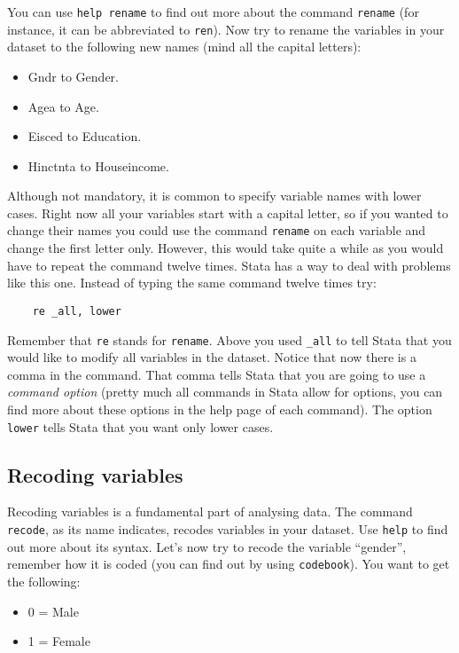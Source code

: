\documentclass{article}
\begin{document}
You can use \texttt{help rename} to find out more about the command \texttt{rename} (for instance, it can be abbreviated to \texttt{ren}). Now try to rename the variables in your dataset to the following new names (mind all the capital letters):

\begin{itemize}
	\item Gndr to Gender.
	\item Agea to Age.
	\item Eisced to Education.
	\item Hinctnta to Houseincome.
\end{itemize}

Although not mandatory, it is common to specify variable names with lower cases. Right now all your variables start with a capital letter, so if you wanted to change their names you could use the command \texttt{rename} on each variable and change the first letter only. However, this would take quite a while as you would have to repeat the command twelve times. Stata has a way to deal with problems like this one. Instead of typing the same command twelve times try:

\begin{lstlisting}
	re _all, lower
\end{lstlisting}

Remember that \texttt{re} stands for \texttt{rename}. Above you used \texttt{\_all} to tell Stata that you would like to modify all variables in the dataset. Notice that now there is a comma in the command. That comma tells Stata that you are going to use a \textit{command option} (pretty much all commands in Stata allow for options, you can find more about these options in the help page of each command). The option \texttt{lower} tells Stata that you want only lower cases.

\subsection*{Recoding variables}

Recoding variables is a fundamental part of analysing data. The command \texttt{recode}, as its name indicates, recodes variables in your dataset. Use \texttt{help} to find out more about its syntax. Let's now try to recode the variable ``gender'', remember how it is coded (you can find out by using \texttt{codebook}). You want to get the following:

\begin{itemize}
	\item 0 = Male
	\item 1 = Female
\end{itemize}
\end{document}
